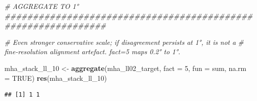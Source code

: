 \documentclass[
  11pt,
]{article}
\newenvironment{Shaded}{\begin{snugshade}}{\end{snugshade}}
\newcommand{\AttributeTok}[1]{\textcolor[rgb]{0.13,0.29,0.53}{#1}}
\newcommand{\CommentTok}[1]{\textcolor[rgb]{0.56,0.35,0.01}{\textit{#1}}}
\newcommand{\ConstantTok}[1]{\textcolor[rgb]{0.56,0.35,0.01}{#1}}
\newcommand{\DecValTok}[1]{\textcolor[rgb]{0.00,0.00,0.81}{#1}}
\newcommand{\FunctionTok}[1]{\textcolor[rgb]{0.13,0.29,0.53}{\textbf{#1}}}
\newcommand{\NormalTok}[1]{#1}
\newcommand{\OtherTok}[1]{\textcolor[rgb]{0.56,0.35,0.01}{#1}}
\begin{document}
\begin{Shaded}
\begin{Highlighting}[]
\CommentTok{\# AGGREGATE TO 1° \#\#\#\#\#\#\#\#\#\#\#\#\#\#\#\#\#\#\#\#\#\#\#\#\#\#\#\#\#\#\#\#\#\#\#\#\#\#\#\#\#\#\#\#\#\#\#\#\#\#\#\#\#\#\#\#\#\#\#\#\#\#}

\CommentTok{\# Even stronger conservative scale; if disagreement persists at 1°, it is not a}
\CommentTok{\# fine{-}resolution alignment artefact. fact=5 maps 0.2° to 1°.}

\NormalTok{mha\_stack\_ll\_10 }\OtherTok{\textless{}{-}} \FunctionTok{aggregate}\NormalTok{(mha\_ll02\_target, }\AttributeTok{fact =} \DecValTok{5}\NormalTok{, }\AttributeTok{fun =}\NormalTok{ sum, }\AttributeTok{na.rm =} \ConstantTok{TRUE}\NormalTok{)}
\FunctionTok{res}\NormalTok{(mha\_stack\_ll\_10)}
\end{Highlighting}
\end{Shaded}

\begin{verbatim}
## [1] 1 1
\end{verbatim}
\end{document}
